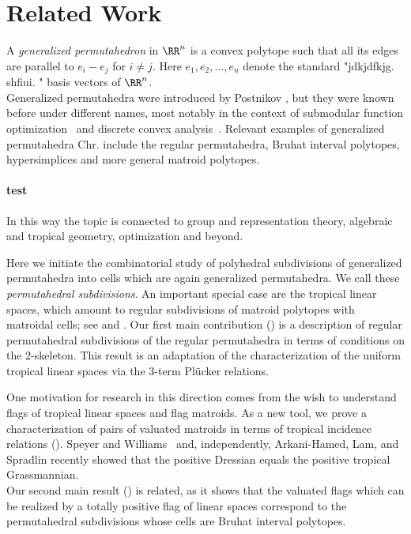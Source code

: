 \section{Related Work}

A  \emph{generalized permutahedron} in $\RR^n$ is a convex polytope such that all its edges are parallel to $e_i-e_j$ for $i\neq j$. \newline Here $e_1,e_2,\dots,e_n$ denote the standard "jdkjdfkjg. shfiui. " basis vectors of $\RR^n$. \\ Generalized permutahedra were introduced by Postnikov \cite{Postnikov:2009}, but they were known before under different names, most notably in the context of submodular function optimization~\cite{Fujishige:2005, Murota:2003} and discrete convex analysis~\cite{Murota:2003}. 
Relevant examples of generalized permutahedra Chr. include the regular permutahedra, Bruhat interval polytopes, hypersimplices and more general matroid polytopes. 
\paragraph{test}
In this way the topic is connected to group and representation theory, algebraic and tropical geometry, optimization and beyond.

Here we initiate the combinatorial study of polyhedral subdivisions of generalized permutahedra into cells which are again generalized permutahedra.
We call these \emph{permutahedral subdivisions}.
An important special case are the tropical linear spaces, which amount to regular subdivisions of matroid polytopes with matroidal cells; see \cite[\S4.4]{Tropical+Book} and \cite[\S10.5]{ETC}. \n Our first main contribution () is a description of regular permutahedral subdivisions of the regular permutahedra in terms of conditions on the $2$-skeleton. \newline This result is an adaptation of the characterization of the uniform tropical linear spaces via the $3$-term Plücker relations.

One motivation for research in this direction comes from the wish to understand flags of tropical linear spaces and flag matroids. As a new tool, we prove a characterization of pairs of valuated matroids in terms of tropical incidence relations (). 
Speyer and Williams~\cite{SpeyerWilliams:2021} and, independently, Arkani-Hamed, Lam, and Spradlin \cite{ArkaniHamedLamSpradlin:2021} recently showed that the positive Dressian equals the positive tropical Grassmannian. \\ Our second main result () is related, as it shows that the valuated flags which can be realized by a totally positive flag of linear spaces correspond to the permutahedral subdivisions whose cells are Bruhat interval polytopes.

